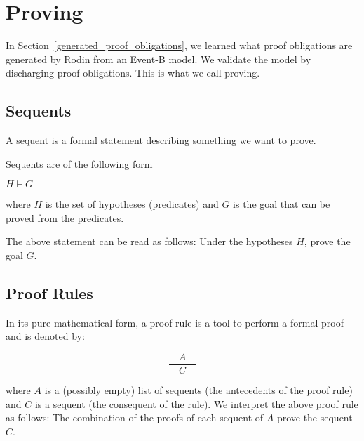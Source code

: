 \clearpage
\section{Proving}
\label{proving}

In Section~\ref{generated_proof_obligations}, we learned what proof obligations are generated by Rodin from an Event-B model.  We validate the model by discharging proof obligations.  This is what we call proving.


\subsection{Sequents}
\label{sequents}

A sequent is a formal statement describing something we want to prove.

Sequents are of the following form 

$H \vdash G$

where $H$ is the set of hypotheses (predicates) and $G$ is the goal that can be proved from the predicates.

The above statement can be read as follows: Under the hypotheses $H$, prove the goal $G$.

\subsection{Proof Rules}
\label{proof_rules}

In its pure mathematical form, a proof rule is a tool to perform a formal proof and is denoted by: 

$$\frac{\quad A\quad}{C}$$

where $A$ is a (possibly empty) list of sequents (the antecedents of the proof rule) and $C$ is a sequent (the consequent of the rule). We interpret the above proof rule as follows: The combination of the proofs of each sequent of $A$ prove the sequent $C$.

